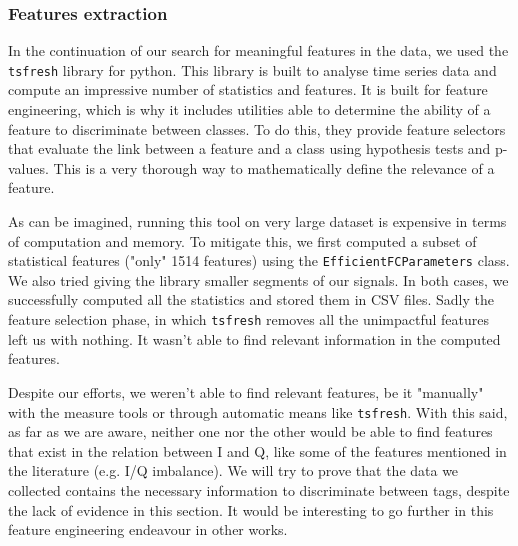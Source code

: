 \subsubsection{Features extraction}

In the continuation of our search for meaningful features in the data, we used the \texttt{tsfresh} library for python. This library is built to analyse time series data and compute an impressive number of statistics and features. It is built for feature engineering, which is why it includes utilities able to determine the ability of a feature to discriminate between classes. To do this, they provide feature selectors that evaluate the link between a feature and a class using hypothesis tests and  p-values. This is a very thorough way to mathematically define the relevance of a feature.

As can be imagined, running this tool on very large dataset is expensive in terms of computation and memory. To mitigate this, we first computed a subset of statistical features ("only" 1514 features) using the \texttt{EfficientFCParameters} class. We also tried giving the library smaller segments of our signals. In both cases, we successfully computed all the statistics and stored them in CSV files. Sadly the feature selection phase, in which \texttt{tsfresh} removes all the unimpactful features left us with nothing. It wasn't able to find relevant information in the computed features.

Despite our efforts, we weren't able to find relevant features, be it "manually" with the measure tools or through automatic means like \texttt{tsfresh}. With this said, as far as we are aware, neither one nor the other would be able to find features that exist in the relation between I and Q, like some of the features mentioned in the literature (e.g. I/Q imbalance). We will try to prove that the data we collected contains the necessary information to discriminate between tags, despite the lack of evidence in this section. It would be interesting to go further in this feature engineering endeavour in other works.
